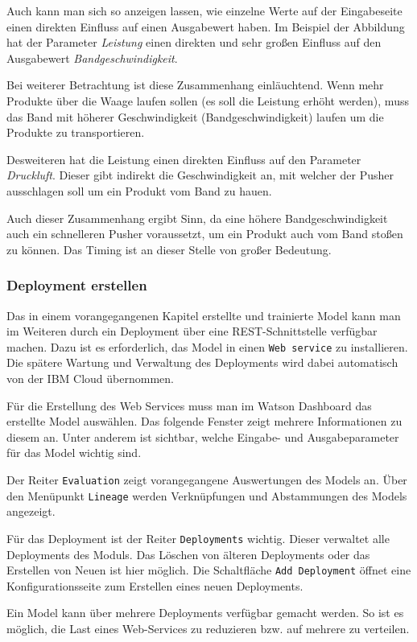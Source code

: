 Auch kann man sich so anzeigen lassen, wie einzelne Werte auf der Eingabeseite einen direkten Einfluss auf einen
Ausgabewert haben. Im Beispiel der Abbildung hat der Parameter \textit{Leistung} einen direkten und sehr großen
Einfluss auf den Ausgabewert \textit{Bandgeschwindigkeit}.

Bei weiterer Betrachtung ist diese Zusammenhang einläuchtend. Wenn mehr Produkte über die Waage laufen sollen (es soll
die Leistung erhöht werden), muss das Band mit höherer Geschwindigkeit (Bandgeschwindigkeit) laufen um die Produkte zu
transportieren.

Desweiteren hat die Leistung einen direkten Einfluss auf den Parameter \textit{Druckluft}. Dieser gibt indirekt die
Geschwindigkeit an, mit welcher der Pusher ausschlagen soll um ein Produkt vom Band zu hauen.

Auch dieser Zusammenhang ergibt Sinn, da eine höhere Bandgeschwindigkeit auch ein schnelleren Pusher voraussetzt, um ein
Produkt auch vom Band stoßen zu können. Das Timing ist an dieser Stelle von großer Bedeutung.

\subsubsection{Deployment erstellen}
Das in einem vorangegangenen Kapitel erstellte und trainierte Model kann man im Weiteren durch ein Deployment über eine
REST-Schnittstelle verfügbar machen. Dazu ist es erforderlich, das Model in einen \texttt{Web service} zu
installieren. Die spätere Wartung und Verwaltung des Deployments wird dabei automatisch von der IBM Cloud übernommen.

Für die Erstellung des Web Services muss man im Watson Dashboard das erstellte Model auswählen. Das folgende Fenster
zeigt mehrere Informationen zu diesem an. Unter anderem ist sichtbar, welche Eingabe- und Ausgabeparameter für das Model
wichtig sind.

Der Reiter \texttt{Evaluation} zeigt vorangegangene Auswertungen des Models an. Über den Menüpunkt \texttt{Lineage}
werden Verknüpfungen und Abstammungen des Models angezeigt.

Für das Deployment ist der Reiter \texttt{Deployments} wichtig. Dieser verwaltet alle Deployments des Moduls. Das Löschen
von älteren Deployments oder das Erstellen von Neuen ist hier möglich. Die Schaltfläche \texttt{Add Deployment} öffnet
eine Konfigurationsseite zum Erstellen eines neuen Deployments.

Ein Model kann über mehrere Deployments verfügbar gemacht werden. So ist es möglich, die Last eines Web-Services zu
reduzieren bzw. auf mehrere zu verteilen.

